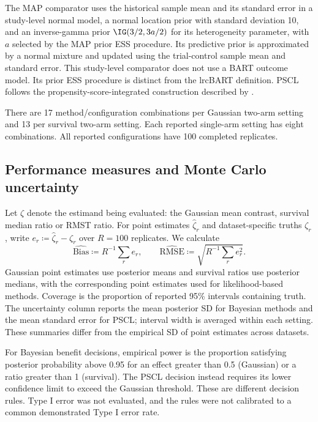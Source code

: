 The MAP comparator uses the historical sample mean and its standard error in a study-level normal model, a normal location prior with standard deviation 10, and an inverse-gamma prior $\IG(3/2,3a/2)$ for its heterogeneity parameter, with $a$ selected by the MAP prior ESS procedure. Its predictive prior is approximated by a normal mixture and updated using the trial-control sample mean and standard error. This study-level comparator does not use a BART outcome model. Its prior ESS procedure is distinct from the lrcBART definition. PSCL follows the propensity-score-integrated construction described by \citet{Chen2020PSCL}.

There are 17 method/configuration combinations per Gaussian two-arm setting and 13 per survival two-arm setting. Each reported single-arm setting has eight combinations. All reported configurations have 100 completed replicates.

\subsection{Performance measures and Monte Carlo uncertainty}\label{sec:E.5}
Let $\zeta$ denote the estimand being evaluated: the Gaussian mean contrast, survival median ratio or RMST ratio. For point estimates $\widehat\zeta_r$ and dataset-specific truths $\zeta_r$, write $e_r\coloneqq \widehat\zeta_r-\zeta_r$ over $R=100$ replicates. We calculate
\begin{equation}
\widehat{\mathrm{Bias}}\coloneqq R^{-1}\sum_r e_r,\qquad
\widehat{\mathrm{RMSE}}\coloneqq \sqrt{R^{-1}\sum_r e_r^2}.
\end{equation}
Gaussian point estimates use posterior means and survival ratios use posterior medians, with the corresponding point estimates used for likelihood-based methods. Coverage is the proportion of reported 95\% intervals containing truth. The uncertainty column reports the mean posterior SD for Bayesian methods and the mean standard error for PSCL; interval width is averaged within each setting. These summaries differ from the empirical SD of point estimates across datasets.

For Bayesian benefit decisions, empirical power is the proportion satisfying posterior probability above 0.95 for an effect greater than 0.5 (Gaussian) or a ratio greater than 1 (survival). The PSCL decision instead requires its lower confidence limit to exceed the Gaussian threshold. These are different decision rules. Type I error was not evaluated, and the rules were not calibrated to a common demonstrated Type I error rate.


